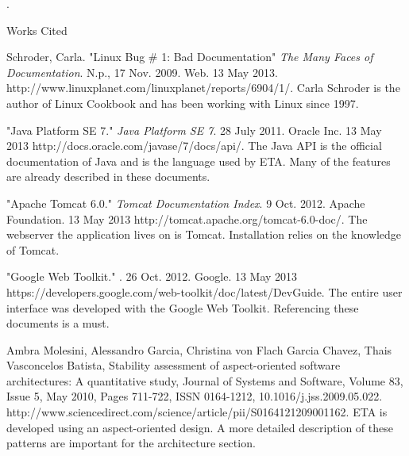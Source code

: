\documentclass[a4paper,12pt]{texMemo}
\newcommand{\bibent}{\noindent \hangindent 40pt}
\newenvironment{workscited}{\newpage \begin{center} Works Cited \end{center}}{\newpage }
\begin{document}
 \newpage. \begin{workscited}
 \bibent
  Schroder, Carla. "Linux Bug \# 1: Bad Documentation" \textit{The Many Faces of Documentation}. N.p., 17 Nov. 2009. Web. 13 May 2013.\\ http://www.linuxplanet.com/linuxplanet/reports/6904/1/. Carla Schroder is the author of Linux Cookbook and has been working with Linux since 1997.

 \bibent
 "Java Platform SE 7." \textit{Java Platform SE 7}. 28 July 2011. Oracle Inc. 13 May 2013 http://docs.oracle.com/javase/7/docs/api/. The Java API is the official documentation of Java and is the language used by ETA. Many of the features are already described in these documents.
 
 \bibent
 "Apache Tomcat 6.0." \textit{Tomcat Documentation Index}. 9 Oct. 2012. Apache Foundation.  13 May 2013 http://tomcat.apache.org/tomcat-6.0-doc/. The webserver the application lives on is Tomcat. Installation relies on the knowledge of Tomcat.
 
 \bibent
 "Google Web Toolkit." . 26 Oct. 2012. Google. 13 May 2013 https://developers.google.com/web-toolkit/doc/latest/DevGuide. The entire user interface was developed with the Google Web Toolkit. Referencing these documents is a must.
 
 \bibent
 Ambra Molesini, Alessandro Garcia, Christina von Flach Garcia Chavez, Thais Vasconcelos Batista, Stability assessment of aspect-oriented software architectures: A quantitative study, Journal of Systems and Software, Volume 83, Issue 5, May 2010, Pages 711-722, ISSN 0164-1212, 10.1016/j.jss.2009.05.022.
http://www.sciencedirect.com/science/article/pii/S0164121209001162. ETA is developed using an aspect-oriented design. A more detailed description of these patterns are important for the architecture section.
 \end{workscited}

 
\end{document}
